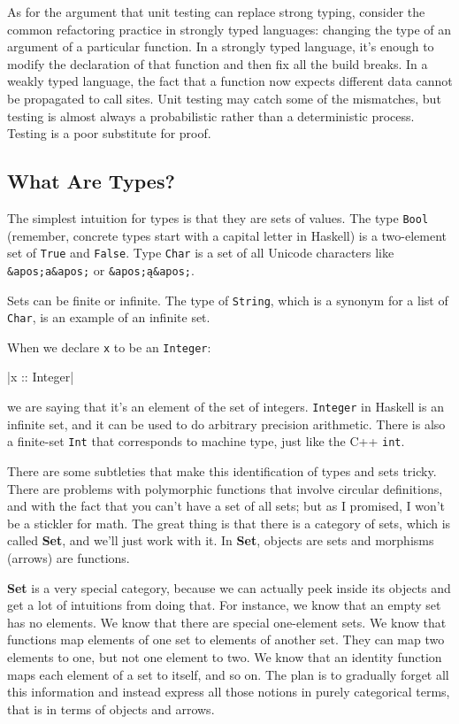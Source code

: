 As for the argument that unit testing can replace strong typing,
consider the common refactoring practice in strongly typed languages:
changing the type of an argument of a particular function. In a strongly
typed language, it's enough to modify the declaration of that function
and then fix all the build breaks. In a weakly typed language, the fact
that a function now expects different data cannot be propagated to call
sites. Unit testing may catch some of the mismatches, but testing is
almost always a probabilistic rather than a deterministic process.
Testing is a poor substitute for proof.

\subsection{What Are Types?}\label{what-are-types}

The simplest intuition for types is that they are sets of values. The
type \texttt{Bool} (remember, concrete types start with a capital letter
in Haskell) is a two-element set of \texttt{True} and \texttt{False}.
Type \texttt{Char} is a set of all Unicode characters like
\texttt{\&apos;a\&apos;} or \texttt{\&apos;ą\&apos;}.

Sets can be finite or infinite. The type of \texttt{String}, which is a
synonym for a list of \texttt{Char}, is an example of an infinite set.

When we declare \texttt{x} to be an \texttt{Integer}:

|x :: Integer|

we are saying that it's an element of the set of integers.
\texttt{Integer} in Haskell is an infinite set, and it can be used to do
arbitrary precision arithmetic. There is also a finite-set \texttt{Int}
that corresponds to machine type, just like the C++ \texttt{int}.

There are some subtleties that make this identification of types and
sets tricky. There are problems with polymorphic functions that involve
circular definitions, and with the fact that you can't have a set of all
sets; but as I promised, I won't be a stickler for math. The great thing
is that there is a category of sets, which is called \textbf{Set}, and
we'll just work with it. In \textbf{Set}, objects are sets and morphisms
(arrows) are functions.

\textbf{Set} is a very special category, because we can actually peek
inside its objects and get a lot of intuitions from doing that. For
instance, we know that an empty set has no elements. We know that there
are special one-element sets. We know that functions map elements of one
set to elements of another set. They can map two elements to one, but
not one element to two. We know that an identity function maps each
element of a set to itself, and so on. The plan is to gradually forget
all this information and instead express all those notions in purely
categorical terms, that is in terms of objects and arrows.

